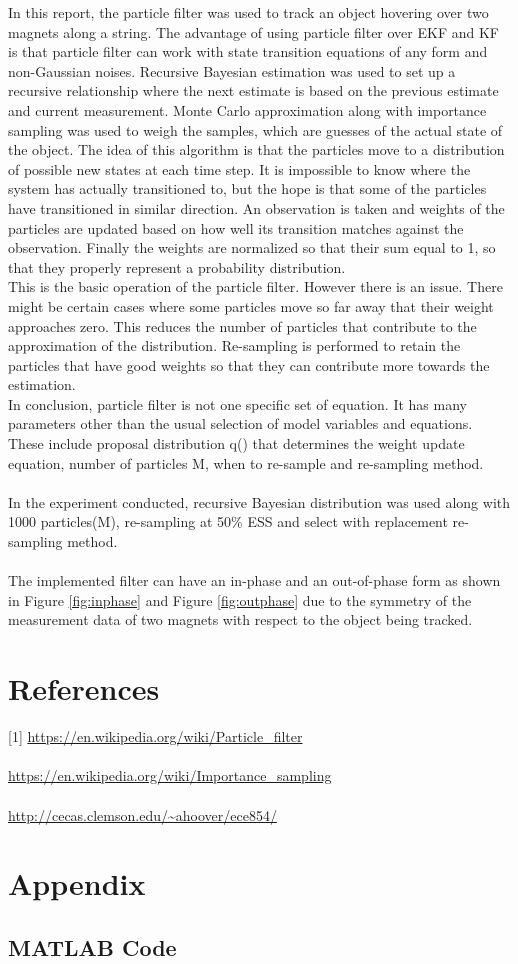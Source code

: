 \documentclass[12pt]{article}
\begin{document}
In this report, the particle filter was used to track an object hovering over two magnets along a string. The advantage of using particle filter over EKF and KF is that particle filter can work with state transition equations of any form and non-Gaussian noises. Recursive Bayesian estimation was used to set up a recursive relationship where the next estimate is based on the previous estimate and current measurement. Monte Carlo approximation along with importance sampling was used to weigh the samples, which are guesses of the actual state of the object. The idea of this algorithm is that the particles move to a distribution of possible new states at each time step. It is impossible to know where the system has actually transitioned to, but the hope is that some of the particles have transitioned in similar direction. An observation is taken and weights of the particles are updated based on how well its transition matches against the observation. Finally the weights are normalized so that their sum equal to 1, so that they properly represent a probability distribution. \\

This is the basic operation of the particle filter. However there is an issue. There might be certain cases where some particles move so far away that their weight approaches zero. This reduces the number of particles that contribute to the approximation of the distribution. Re-sampling is performed to retain the particles that have good weights so that they can contribute more towards the estimation.  \\

In conclusion, particle filter is not one specific set of equation. It has many parameters other than the usual selection of model variables and equations. These include proposal distribution q() that determines the weight update equation, number of particles M, when to re-sample and re-sampling method. \\
\\
In the experiment conducted, recursive Bayesian distribution was used along with 1000 particles(M), re-sampling at 50\% ESS and select with replacement re-sampling method. \\
\\
The implemented filter can have an in-phase and an out-of-phase form as shown in Figure \ref{fig:inphase} and Figure \ref{fig:outphase} due to the symmetry of the measurement data of two magnets with respect to the object being tracked.

\section*{References}
[1] \url{https://en.wikipedia.org/wiki/Particle_filter} \\
\\ \noindent
[2] \url{https://en.wikipedia.org/wiki/Importance_sampling} \\
\\ \noindent
[3] \url{http://cecas.clemson.edu/~ahoover/ece854/}
\section*{Appendix}

\subsection*{MATLAB Code}

\end{document}
